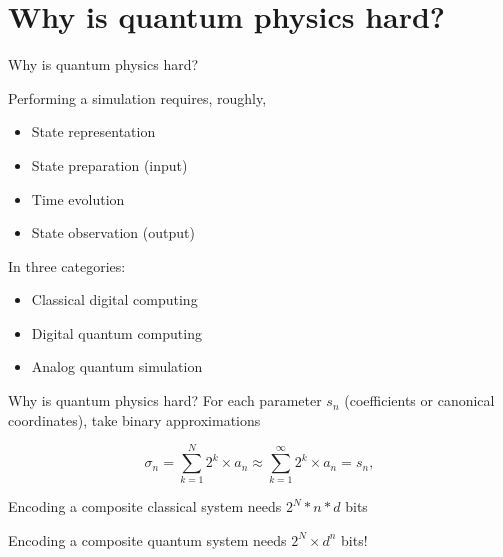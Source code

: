 \documentclass[10pt]{beamer}
\begin{document}
\section{Why is quantum physics hard?}
\begin{frame}{Why is quantum physics hard?}

Performing a simulation requires, roughly,
\begin{itemize}
    \item State representation
    \item State preparation (input)
    \item Time evolution 
    \item State observation (output)
\end{itemize}

In three categories:
\begin{itemize}
    \item Classical digital computing
    \item Digital quantum computing
    \item Analog quantum simulation
\end{itemize}

    
\end{frame}

\begin{frame}{Why is quantum physics hard?}
For each parameter $s_n$ (coefficients or canonical coordinates), take binary approximations

$$\sigma_n = \sum_{k=1}^N 2^k\times a_n \approx  \sum_{k=1}^\infty 2^k\times a_n= s_n,$$ 

Encoding a composite classical system needs $2^N*n*d$ bits

Encoding a composite quantum system needs $2^N\times d^n$ bits!

\end{frame}
\end{document}
